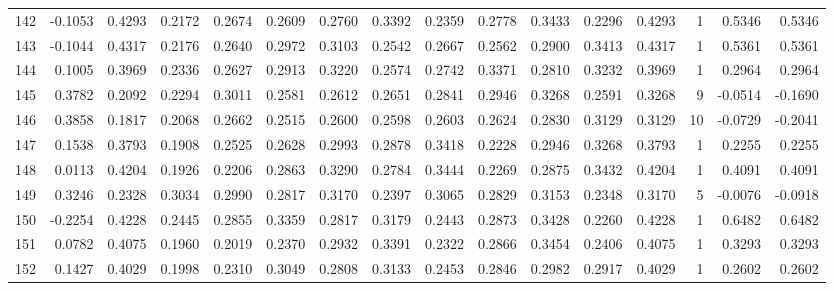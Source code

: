 \begin{tabular}{lrrrrrrrrrrrrrrr}
142 &     -0.1053 &  0.4293 &  0.2172 &  0.2674 &  0.2609 &  0.2760 &  0.3392 &  0.2359 &  0.2778 &  0.3433 &   0.2296 &     0.4293 &      1 &                    0.5346 &                     0.5346 \\
143 &     -0.1044 &  0.4317 &  0.2176 &  0.2640 &  0.2972 &  0.3103 &  0.2542 &  0.2667 &  0.2562 &  0.2900 &   0.3413 &     0.4317 &      1 &                    0.5361 &                     0.5361 \\
144 &      0.1005 &  0.3969 &  0.2336 &  0.2627 &  0.2913 &  0.3220 &  0.2574 &  0.2742 &  0.3371 &  0.2810 &   0.3232 &     0.3969 &      1 &                    0.2964 &                     0.2964 \\
145 &      0.3782 &  0.2092 &  0.2294 &  0.3011 &  0.2581 &  0.2612 &  0.2651 &  0.2841 &  0.2946 &  0.3268 &   0.2591 &     0.3268 &      9 &                   -0.0514 &                    -0.1690 \\
146 &      0.3858 &  0.1817 &  0.2068 &  0.2662 &  0.2515 &  0.2600 &  0.2598 &  0.2603 &  0.2624 &  0.2830 &   0.3129 &     0.3129 &     10 &                   -0.0729 &                    -0.2041 \\
147 &      0.1538 &  0.3793 &  0.1908 &  0.2525 &  0.2628 &  0.2993 &  0.2878 &  0.3418 &  0.2228 &  0.2946 &   0.3268 &     0.3793 &      1 &                    0.2255 &                     0.2255 \\
148 &      0.0113 &  0.4204 &  0.1926 &  0.2206 &  0.2863 &  0.3290 &  0.2784 &  0.3444 &  0.2269 &  0.2875 &   0.3432 &     0.4204 &      1 &                    0.4091 &                     0.4091 \\
149 &      0.3246 &  0.2328 &  0.3034 &  0.2990 &  0.2817 &  0.3170 &  0.2397 &  0.3065 &  0.2829 &  0.3153 &   0.2348 &     0.3170 &      5 &                   -0.0076 &                    -0.0918 \\
150 &     -0.2254 &  0.4228 &  0.2445 &  0.2855 &  0.3359 &  0.2817 &  0.3179 &  0.2443 &  0.2873 &  0.3428 &   0.2260 &     0.4228 &      1 &                    0.6482 &                     0.6482 \\
151 &      0.0782 &  0.4075 &  0.1960 &  0.2019 &  0.2370 &  0.2932 &  0.3391 &  0.2322 &  0.2866 &  0.3454 &   0.2406 &     0.4075 &      1 &                    0.3293 &                     0.3293 \\
152 &      0.1427 &  0.4029 &  0.1998 &  0.2310 &  0.3049 &  0.2808 &  0.3133 &  0.2453 &  0.2846 &  0.2982 &   0.2917 &     0.4029 &      1 &                    0.2602 &                     0.2602 \\

\end{tabular}
